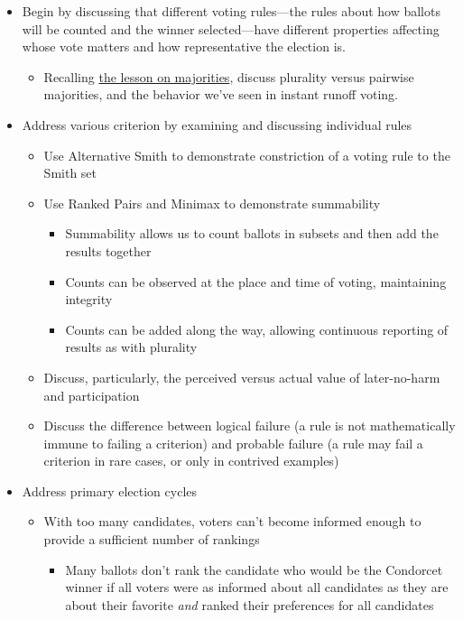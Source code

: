 \begin{itemize}
    \item Begin by discussing that different voting rules—the rules about how ballots will be counted and the winner selected—have different properties affecting whose vote matters and how representative the election is.
    \begin{itemize}
        \item Recalling \hyperref[cur:majority]{the lesson on majorities}, discuss plurality versus pairwise majorities, and the behavior we've seen in instant runoff voting.
    \end{itemize}

    \item Address various criterion by examining and discussing individual rules
    \begin{itemize}
        \item Use Alternative Smith to demonstrate constriction of a voting rule to the Smith set

        \item Use Ranked Pairs and Minimax to demonstrate summability
        \begin{itemize}
            \item Summability allows us to count ballots in subsets and then add the results together

            \item Counts can be observed at the place and time of voting, maintaining integrity

            \item Counts can be added along the way, allowing continuous reporting of results as with plurality
        \end{itemize}

        \item Discuss, particularly, the perceived versus actual value of later-no-harm and participation

        \item Discuss the difference between logical failure (a rule is not mathematically immune to failing a criterion) and probable failure (a rule may fail a criterion in rare cases, or only in contrived examples)
    \end{itemize}

    \item Address primary election cycles
    \begin{itemize}
        \item With too many candidates, voters can't become informed enough to provide a sufficient number of rankings
        \begin{itemize}
            \item Many ballots don't rank the candidate who would be the Condorcet winner if all voters were as informed about all candidates as they are about their favorite \textit{and} ranked their preferences for all candidates


\end{itemize}
\end{itemize}
\end{itemize}

